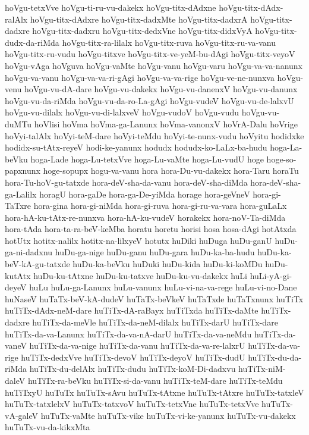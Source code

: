 {hoVgu-tetxVve
hoVgu-ti-ru-vu-dakekx
hoVgu-titx-dAdxne
hoVgu-titx-dAdx-ralAlx
hoVgu-titx-dAdxre
hoVgu-titx-dadxMte
hoVgu-titx-dadxrA
hoVgu-titx-dadxre
hoVgu-titx-dadxru
hoVgu-titx-dedxVne
hoVgu-titx-didxVyA
hoVgu-titx-dudx-da-riMda
hoVgu-titx-ra-lilalx
hoVgu-titx-ruva
hoVgu-titx-ru-va-vanu
hoVgu-titx-ru-vudu
hoVgu-titxve
hoVgu-titx-ve-yeM-bu-dAgi
hoVgu-titx-veyoV
hoVgu-vAga
hoVguva
hoVgu-vaMte
hoVgu-vanu
hoVgu-varu
hoVgu-va-va-nanunx
hoVgu-va-vanu
hoVgu-va-va-ri-gAgi
hoVgu-va-va-rige
hoVgu-ve-ne-nunxva
hoVgu-venu
hoVgu-vu-dA-dare
hoVgu-vu-dakekx
hoVgu-vu-danenxV
hoVgu-vu-danunx
hoVgu-vu-da-riMda
hoVgu-vu-da-ro-La-gAgi
hoVgu-vudeV
hoVgu-vu-de-lalxvU
hoVgu-vu-dilalx
hoVgu-vu-di-lalxveV
hoVgu-vudoV
hoVgu-vudu
hoVgu-vu-duMTu
hoVlisi
hoVma
hoVma-ga-Lanunx
hoVma-vanonxV
hoVrA-Dalu
hoVrige
hoVyi-talAlx
hoVyi-teM-dare
hoVyi-teMdu
hoVyi-te-nunx-vudu
hoVyitu
hodidxke
hodidx-su-tAtx-reyeV
hodi-ke-yanunx
hodudx
hodudx-ko-LaLx-ba-hudu
hoga-La-beVku
hoga-Lade
hoga-Lu-tetxVve
hoga-Lu-vaMte
hoga-Lu-vudU
hoge
hoge-so-papxnunx
hoge-sopupx
hogu-va-vanu
hora
hora-Du-vu-dakekx
hora-Taru
horaTu
hora-Tu-hoV-gu-tatxde
hora-deV-sha-da-vanu
hora-deV-sha-diMda
hora-deV-sha-ga-Lalilx
horagU
hora-gaDe
hora-ga-De-yiMda
horage
hora-geVneV
hora-gi-TaTxre
hora-gina
hora-gi-niMda
hora-gi-ruva
hora-gi-ru-va-vara
hora-guLaLx
hora-hA-ku-tAtx-re-nunxva
hora-hA-ku-vudeV
horakekx
hora-noV-Ta-diMda
hora-tAda
hora-ta-ra-beV-keMba
horatu
horetu
horisi
hosa
hosa-dAgi
hotAtxda
hotUtx
hotitx-nalilx
hotitx-na-lilxyeV
hotutx
huDiki
huDuga
huDu-ganU
huDu-ga-ni-dadxnu
huDu-ga-nige
huDu-ganu
huDu-gara
huDu-ka-ba-hudu
huDu-ka-beV-kA-gu-tatxde
huDu-ka-beVku
huDuki
huDu-kida
huDu-ki-koMDu
huDu-kutAtx
huDu-ku-tAtxne
huDu-ku-tatxve
huDu-ku-vu-dakekx
huLi
huLi-yA-gi-deyeV
huLu
huLu-ga-Lanunx
huLu-vanunx
huLu-vi-na-va-rege
huLu-vi-no-Dane
huNaseV
huTaTx-beV-kA-dudeV
huTaTx-beVkeV
huTaTxde
huTaTxnunx
huTiTx
huTiTx-dAdx-neM-dare
huTiTx-dA-raBayx
huTiTxda
huTiTx-daMte
huTiTx-dadxre
huTiTx-da-meVle
huTiTx-da-neM-dilalx
huTiTx-darU
huTiTx-dare
huTiTx-da-va-Lanunx
huTiTx-da-va-nA-darU
huTiTx-da-va-neMdu
huTiTx-da-vaneV
huTiTx-da-va-nige
huTiTx-da-vanu
huTiTx-da-va-re-lalxrU
huTiTx-da-va-rige
huTiTx-dedxVve
huTiTx-devoV
huTiTx-deyoV
huTiTx-dudU
huTiTx-du-da-riMda
huTiTx-du-delAlx
huTiTx-dudu
huTiTx-koM-Di-dadxvu
huTiTx-niM-daleV
huTiTx-ra-beVku
huTiTx-si-da-vanu
huTiTx-teM-dare
huTiTx-teMdu
huTiTxyU
huTuTx
huTuTx-sAvu
huTuTx-tAtxne
huTuTx-tAtxre
huTuTx-tatxleV
huTuTx-tatxlelxV
huTuTx-tatxvoV
huTuTx-tetxVne
huTuTx-tetxVve
huTuTx-vA-galeV
huTuTx-vaMte
huTuTx-vike
huTuTx-vi-ke-yanunx
huTuTx-vu-dakekx
huTuTx-vu-da-kikxMta
}
